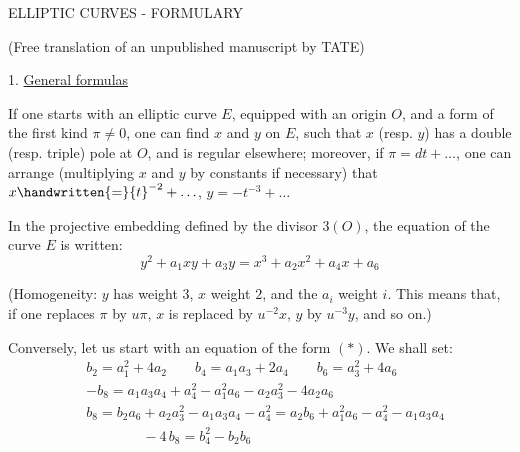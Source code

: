 
\begin{center}
ELLIPTIC CURVES - FORMULARY

(Free translation of an unpublished manuscript by TATE)
\end{center}


1. \uline{General formulas}

If one starts with an elliptic curve $E$, equipped with an origin $O$, and a form of the first kind $\pi\ne 0$, one can find $x$ and $y$ on $E$, such that $x$ (resp. $y$) has a double (resp. triple) pole at $O$, and is regular elsewhere; moreover, if $\pi=dt+\ldots$, one can arrange (multiplying $x$ and $y$ by constants if necessary) that $x\handwritten{=}{t}^{-2}+\ldots$, $y=-t^{-3}+\ldots$

In the projective embedding defined by the divisor $3(O)$, the equation of the curve $E$ is written:
{\makeatletter\tagsleft@true\makeatother
\[
 y^{2}+a_{1}xy+a_{3}y=x^{3}+a_{2}x^{2}+a_{4}x+a_{6}
 \tag*{$(\ast)$}
\]
}

(Homogeneity: $y$ has weight $3$, $x$ weight $2$, and the $a_{i}$ weight $i$. This means that, if one replaces $\pi$ by $u\pi$, $x$ is replaced by $u^{-2}x$, $y$ by $u^{-3}y$, and so on.)

Conversely, let us start with an equation of the form $(\ast)$. We shall set:
\[
\begin{aligned}
& b_{2}=a_{1}^{2}+4a_{2} \qquad b_{4}=a_{1}a_{3}+2a_{4} \qquad b_{6}=a_{3}^{2}+4a_{6} \\
& -b_{8}=a_{1}a_{3}a_{4}+a_{4}^{2}-a_{1}^{2}a_{6}-a_{2}a_{3}^{2}-4a_{2}a_{6} \\
& b_{8}=b_{2}a_{6}+a_{2}a_{3}^{2}-a_{1}a_{3}a_{4}-a_{4}^{2}=a_{2}b_{6}+a_{1}^{2}a_{6}-a_{4}^{2}-a_{1}a_{3}a_{4} \\
& \hspace{4em}-4\,b_{8}=b_{4}^{2}-b_{2}b_{6}
\end{aligned}
\]
